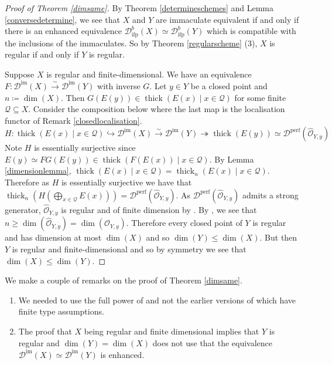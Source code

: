 \documentclass[12pt,oneside]{amsart}
\DeclareMathOperator{\thick}{thick}
\DeclareMathOperator{\perf}{perf}
\DeclareMathOperator{\immac}{im}
\DeclareMathOperator{\ifp}{ifp}
\begin{document}
\begin{proof}[Proof of Theorem \ref{dimsame}]
By Theorem \ref{determineschemes} and Lemma \ref{conversedetermine}, we see that $X$ and $Y$ are immaculate equivalent if and only if there is an enhanced equivalence $\mathcal{D}^b_{\ifp}(X) \simeq \mathcal{D}^b_{\ifp}(Y)$ which is compatible with the inclusions of the immaculates. So by Theorem \ref{regularscheme} (3), $X$ is regular if and only if $Y$ is regular. 

Suppose $X$ is regular and finite-dimensional. We have an equivalence $F: \mathcal{D}^{\immac}(X) \xrightarrow{\sim} \mathcal{D}^{\immac}(Y)$ with inverse $G$. Let $y \in Y$ be a closed point and $n \coloneq \dim(X)$. Then $G(E(y)) \in \thick(E(x) \mid x \in \mathcal{Q})$ for some finite $\mathcal{Q} \subseteq X$. Consider the composition below where the last map is the localisation functor of Remark \ref{closedlocalisation}.
\[
H: \thick(E(x) \mid x \in \mathcal{Q}) \hookrightarrow \mathcal{D}^{\immac}(X) \xrightarrow{\sim} \mathcal{D}^{\immac}(Y) \twoheadrightarrow \thick(E(y)) \simeq \mathcal{D}^{\perf}(\widehat{\mathcal{O}}_{Y,y})
\]
Note $H$ is essentially surjective since $E(y) \simeq FG(E(y)) \in \thick(F(E(x)) \mid x \in \mathcal{Q})$. By Lemma \ref{dimensionlemma}, $\thick(E(x) \mid x \in \mathcal{Q}) = \thick_n(E(x) \mid x \in \mathcal{Q})$. Therefore as $H$ is essentially surjective we have that $\thick_n(H(\bigoplus_{x \in \mathcal{Q}} E(x))) = \mathcal{D}^{\perf}(\widehat{\mathcal{O}}_{Y,y})$. As $\mathcal{D}^{\perf}(\widehat{\mathcal{O}}_{Y,y})$ admits a strong generator, $\widehat{\mathcal{O}}_{Y,y}$ is regular and of finite dimension by \cite[Proposition 7.5]{Rou08}.  By \cite[Theorem A]{Let25}, we see that $n \geq \dim(\widehat{\mathcal{O}}_{Y,y}) = \dim(\mathcal{O}_{Y,y})$. Therefore every closed point of $Y$ is regular and has dimension at most $\dim(X)$ and so $\dim(Y) \leq \dim(X)$. But then $Y$ is regular and finite-dimensional and so by symmetry we see that $\dim(X) \leq \dim(Y)$. 
\end{proof}

\begin{remark} We make a couple of remarks on the proof of Theorem \ref{dimsame}.
\begin{enumerate}
\item We needed to use the full power of \cite[Theorem A]{Let25} and not the earlier versions of 
\cite{Rou08} which have finite type assumptions. 

\item The proof that $X$ being regular and finite dimensional implies that $Y$ is regular and $\dim(Y) = \dim(X)$ does not use that the equivalence $\mathcal{D}^{\immac}(X) \simeq \mathcal{D}^{\immac}(Y)$ is enhanced. 
\end{enumerate}
\end{remark}
\end{document}
